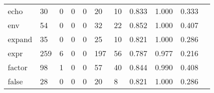 \begin{longtable}{lp{1.2cm}p{1.2cm}p{1.2cm}p{1.2cm}p{1.2cm}p{1.2cm}p{1.2cm}p{1.2cm}p{1.2cm}p{1.2cm}}
echo      &                                    30 &                                                  0 &                                                  0 &                                                  0 &                                                 20 &                                                 10 &                                         0.833 &                                              1.000 &                                              0.333 \\
env       &                                    54 &                                                  0 &                                                  0 &                                                  0 &                                                 32 &                                                 22 &                                         0.852 &                                              1.000 &                                              0.407 \\
expand    &                                    35 &                                                  0 &                                                  0 &                                                  0 &                                                 25 &                                                 10 &                                         0.821 &                                              1.000 &                                              0.286 \\
expr      &                                   259 &                                                  6 &                                                  0 &                                                  0 &                                                197 &                                                 56 &                                         0.787 &                                              0.977 &                                              0.216 \\
factor    &                                    98 &                                                  1 &                                                  0 &                                                  0 &                                                 57 &                                                 40 &                                         0.844 &                                              0.990 &                                              0.408 \\
false     &                                    28 &                                                  0 &                                                  0 &                                                  0 &                                                 20 &                                                  8 &                                         0.821 &                                              1.000 &                                              0.286 \\

\end{longtable}
